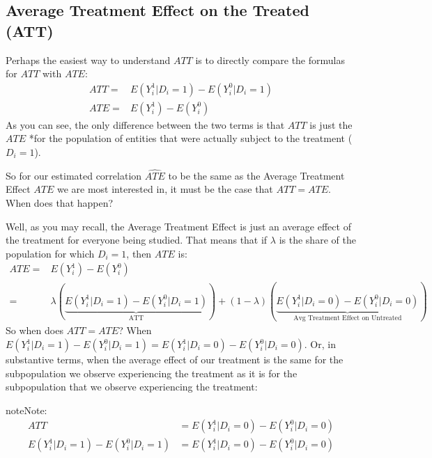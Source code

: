 \documentclass[letterpaper,10pt,english]{jupyterBook}
\begin{document}
\subsection{Average Treatment Effect on the Treated (ATT)}
\label{\detokenize{35_causal/10_potential_outcomes:average-treatment-effect-on-the-treated-att}}
\sphinxAtStartPar
Perhaps the easiest way to understand \(ATT\) is to directly compare the formulas for \(ATT\) with \(ATE\):
\begin{equation*}
\begin{split}
ATT =& E(Y^1_i|D_i = 1) - E(Y_i^0|D_i = 1) \\
ATE =& E(Y^1_i) - E(Y_i^0)
\end{split}
\end{equation*}
\sphinxAtStartPar
As you can see, the only difference between the two terms is that \(ATT\) is just the \(ATE\) *for the population of entities that were actually subject to the treatment (\(D_i = 1\)).

\sphinxAtStartPar
So for our estimated correlation \(\widehat{ATE}\) to be the same as the Average Treatment Effect \(ATE\) we are most interested in, it must be the case that \(ATT = ATE\). When does that happen?

\sphinxAtStartPar
Well, as you may recall, the Average Treatment Effect is just an average effect of the treatment for everyone being studied. That means that if \(\lambda\) is the share of the population for which \(D_i = 1\), then \(ATE\) is:
\begin{equation*}
\begin{split}
ATE =& E(Y^1_i) - E(Y_i^0) \\
 =& \lambda \left(\underbrace{E(Y^1_i | D_i = 1) - E(Y_i^0 | D_i = 1)}_\text{ATT}\right) + (1-\lambda) \left(\underbrace{E(Y^1_i | D_i = 0) - E(Y_i^0 | D_i = 0)}_\text{Avg Treatment Effect on Untreated}\right)
\end{split}
\end{equation*}
\sphinxAtStartPar
So when does \(ATT = ATE\)? When \(E(Y^1_i | D_i = 1) - E(Y_i^0 | D_i = 1) = E(Y^1_i | D_i = 0) - E(Y_i^0 | D_i = 0)\). Or, in substantive terms, when the average effect of our treatment is the same for the subpopulation we observe experiencing the treatment as it is for the subpopulation that we observe  experiencing the treatment:

\begin{sphinxadmonition}{note}{Note:}
\sphinxAtStartPar
{}
\begin{equation}\label{equation:35_causal/10_potential_outcomes:eqn:condition_2}
\begin{split}
ATT &= E(Y^1_i|D_i = 0) - E(Y_i^0|D_i = 0) \\
E(Y^1_i|D_i = 1) - E(Y_i^0|D_i = 1) &= E(Y^1_i|D_i = 0) - E(Y_i^0|D_i = 0)
\end{split}
\end{equation}\end{sphinxadmonition}
\end{document}
